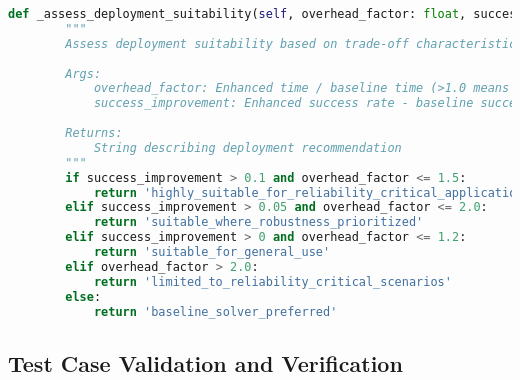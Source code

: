 \begin{lstlisting}[language=Python, caption=Statistical Analysis and Comparison Framework]
    def _assess_deployment_suitability(self, overhead_factor: float, success_improvement: float) -> str:
        """
        Assess deployment suitability based on trade-off characteristics.
        
        Args:
            overhead_factor: Enhanced time / baseline time (>1.0 means slower)
            success_improvement: Enhanced success rate - baseline success rate
            
        Returns:
            String describing deployment recommendation
        """
        if success_improvement > 0.1 and overhead_factor <= 1.5:
            return 'highly_suitable_for_reliability_critical_applications'
        elif success_improvement > 0.05 and overhead_factor <= 2.0:
            return 'suitable_where_robustness_prioritized'
        elif success_improvement > 0 and overhead_factor <= 1.2:
            return 'suitable_for_general_use'
        elif overhead_factor > 2.0:
            return 'limited_to_reliability_critical_scenarios'
        else:
            return 'baseline_solver_preferred'
\end{lstlisting}

\subsection{Test Case Validation and Verification}
\label{appendix:test-validation}

